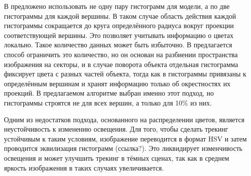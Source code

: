 В \cite{Tjaden2017} предложено использовать не одну пару гистограмм для модели,
а по две гистограммы для каждой вершины.
В таком случае область действия каждой гистограммы сокращается до круга
определённого радиуса вокруг проекции соответствующей вершины.
Это позволяет учитывать информацию о цветах локально.
Такое количество данных может быть избыточно.
В \cite{RegionPhotometric} предлагается способ ограничить это количество, но он
основан на разбиении пространства изображения на секторы, и  в случае поворота
объекта отдельная гистограмма фиксирует цвета с разных частей объекта, тогда
как в \cite{Tjaden2017} гистограммы привязаны к определённым вершинам и хранят
информацию только об окрестностях их проекций.
В предлагаемом алгоритме выбран именно этот подход, но гистограммы строятся не
для всех вершин, а только для 10\% из них.

Одним из недостатков подхода, основанного на распределении цветов, является
неустойчивость к изменению освещения.
Для того, чтобы сделать трекинг устойчивым к таким условиям, изображение
переводится в формат HSV и затем проводится эквилизация гистограмм (ссылка?).
Это ликвидирует изменчивость освещения и может улучшить трекинг в тёмных
сценах, так как в среднем яркость изображения в таких случаях увеличивается.
